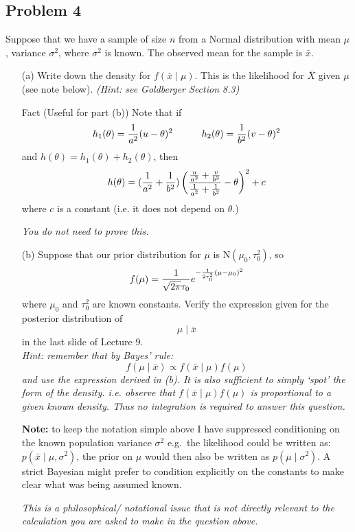 \documentclass{article}
\newcommand{\1}{\mathbf{1}}
\begin{document}
\newpage
\subsection*{Problem 4}

Suppose that we have a sample of size $n$ from a Normal distribution with mean $\mu$, variance $\sigma^2$, where $\sigma^2$ is known. The observed mean for the sample is $\bar{x}$.
\begin{enumerate}
    \item[(a)] Write down the density for $f(\bar{x} \mid \mu)$.  This is the likelihood for $\bar{X}$ given $\mu$ (see note below).
    {\it (Hint: see Goldberger Section 8.3)}
    
    \item[Fact] (Useful for part (b)) Note that if
    $$h_1(\theta) = {1\over {a^2}} (u-\theta)^2 \quad\quad\quad  h_2(\theta) = {1\over{b^2}} (v-\theta)^2$$ 
    and $h(\theta) = h_1(\theta) + h_2(\theta)$, then
    $$h(\theta) = {({1\over {a^2}}+{1\over{b^2}})}\left({{{u\over {a^2}}+{v\over{b^2}}}\over {{1\over {a^2}}+{1\over{b^2}}}} - \theta \right)^2 + c$$
    where $c$ is a constant (i.e. it does not depend on $\theta$.)\par
    {\it You do not need to prove this.}

    \item[(b)] Suppose that our prior distribution for $\mu$ is N$(\mu_0,\tau_0^2)$, so 
    $$f(\mu) = {1\over{\sqrt{2\pi} \tau_0}}e^{-{1\over {2\tau_0^2}} (\mu-\mu_0)^2}$$
    where $\mu_0$ and $\tau_0^2$ are known constants. Verify the expression given for the posterior distribution of 
    $$\mu \mid \bar{x}$$
    in the last slide of Lecture 9.\\[16pt]
    {\it Hint: remember that by Bayes' rule:
    $$f(\mu \mid \bar{x}) \propto f(\bar{x} \mid \mu) f(\mu)$$
    and use the expression derived in (b). It is also sufficient to simply `spot' the form of the density. i.e. observe that $f(\bar{x} \mid \mu) f(\mu)$ is proportional to a given known density. Thus no integration is required to answer this question.}
\bigskip

 
{\small {\bf\small  Note:} to keep the notation simple above I have suppressed conditioning on the
known population variance $\sigma^2$ e.g.~the likelihood could be
written as: $p(\bar{x} \mid \mu, \sigma^2)$, the prior on $\mu$ would then also be written
as $p(\mu \mid \sigma^2)$. A strict Bayesian might prefer to condition explicitly
on the constants to make clear what was being assumed known.\par
{\it This is a philosophical/ notational issue that is not directly relevant to the
calculation you are asked to make in the question above.}\par
}
\end{enumerate}
\end{document}
